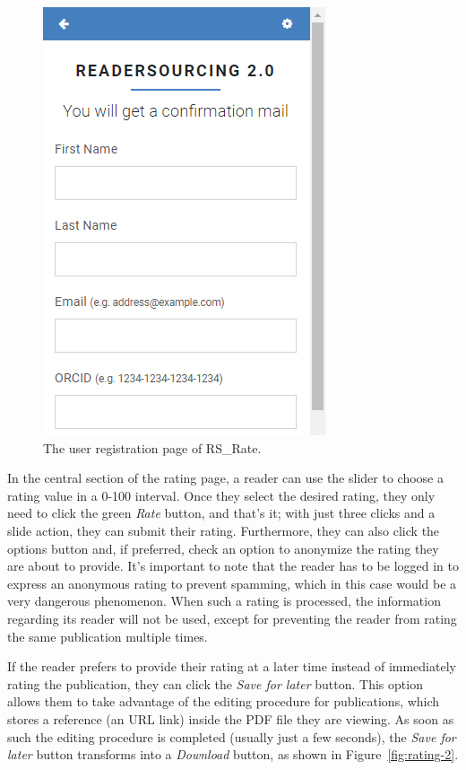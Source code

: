 \documentclass[a4paper, english]{article}
\newcommand{\rsrate}{RS\_Rate\xspace}
\begin{document}
\begin{figure}
\centering
\includegraphics[scale=0.7]{figures/signup.PNG}
\caption{The user registration page of \rsrate.}
\label{fig:signup}
\end{figure}


In the central section of the rating page, a reader can use the slider to choose a rating value in a 0-100 interval. Once they select the desired rating, they only need to click the green \emph{Rate} button, and that's it; with just three clicks and a slide action, they can submit their rating. Furthermore, they can also click the options button and, if preferred, check an option to anonymize the rating they are about to provide. It's important to note that the reader has to be logged in to express an anonymous rating to prevent spamming, which in this case would be a very dangerous phenomenon. When such a rating is processed, the information regarding its reader will not be used, except for preventing the reader from rating the same publication multiple times.

If the reader prefers to provide their rating at a later time instead of immediately rating the publication, they can click the \emph{Save for later} button. This option allows them to take advantage of the editing procedure for publications, which stores a reference (an URL link) inside the PDF file they are viewing. As soon as such the editing procedure is completed (usually just a few seconds), the \emph{Save for later} button transforms into a \emph{Download} button, as shown in Figure~\ref{fig:rating-2}.
\end{document}

